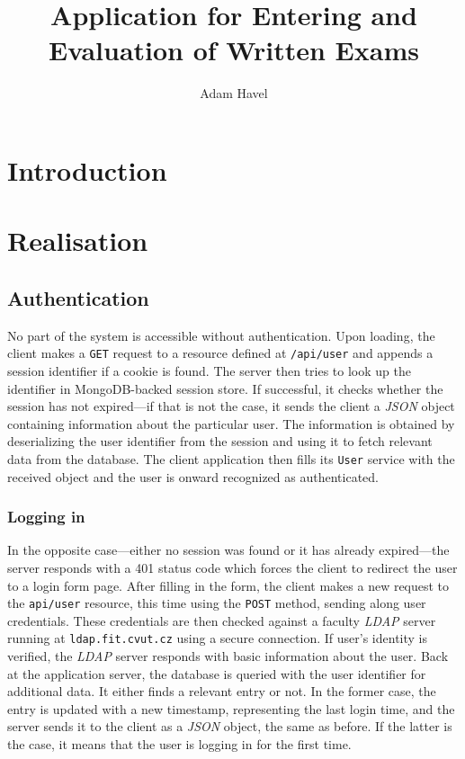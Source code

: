 \documentclass[thesis=M,english,hidelinks]{FITthesis}[2012/10/20]
\title{Application for Entering and Evaluation of Written Exams}
\author{Adam Havel}
\newcommand{\code}{\texttt}
\begin{document}
\chapter{Introduction}


\chapter{Realisation}

\section{Authentication}

No part of the system is accessible without authentication. Upon loading, the client makes a \code{GET} request to a resource defined at \code{/api/user} and appends a session identifier if a cookie is found. The server then tries to look up the identifier in MongoDB-backed session store. If successful, it checks whether the session has not expired---if that is not the case, it sends the client a \textit{JSON} object containing information about the particular user. The information is obtained by deserializing the user identifier from the session and using it to fetch relevant data from the database. The client application then fills its \code{User} service with the received object and the user is onward recognized as authenticated.

\subsection{Logging in}

In the opposite case---either no session was found or it has already expired---the server responds with a 401 status code which forces the client to redirect the user to a login form page. After filling in the form, the client makes a new request to the \code{api/user} resource, this time using the \code{POST} method, sending along user credentials. These credentials are then checked against a faculty \textit{LDAP} server running at \code{ldap.fit.cvut.cz} using a secure connection. If user's identity is verified, the \textit{LDAP} server responds with basic information about the user. Back at the application server, the database is queried with the user identifier for additional data. It either finds a relevant entry or not. In the former case, the entry is updated with a new timestamp, representing the last login time, and the server sends it to the client as a \textit{JSON} object, the same as before. If the latter is the case, it means that the user is logging in for the first time.
\end{document}
